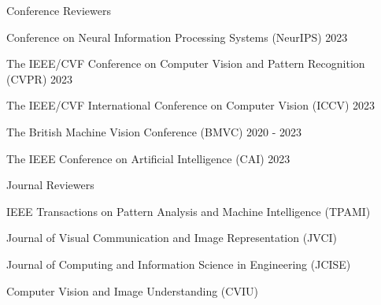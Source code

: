 


\begin{cventries}

\cvpub
{Conference Reviewers} %
{ %
\begin{cvitems}
    \item {Conference on Neural Information Processing Systems (NeurIPS) 2023}
    \item {The IEEE/CVF Conference on Computer Vision and Pattern Recognition (CVPR) 2023}
    \item {The IEEE/CVF International Conference on Computer Vision (ICCV) 2023}
    \item {The British Machine Vision Conference (BMVC) 2020 - 2023}
    \item {The IEEE Conference on Artificial Intelligence (CAI) 2023}
\end{cvitems}
}
\cvpub
{Journal Reviewers} %
{
\begin{cvitems}
    \item {IEEE Transactions on Pattern Analysis and Machine Intelligence (TPAMI)}
    \item {Journal of Visual Communication and Image Representation (JVCI)}
    \item {Journal of Computing and Information Science in Engineering (JCISE)}
    \item {Computer Vision and Image Understanding (CVIU)}
\end{cvitems}
}
\end{cventries}

